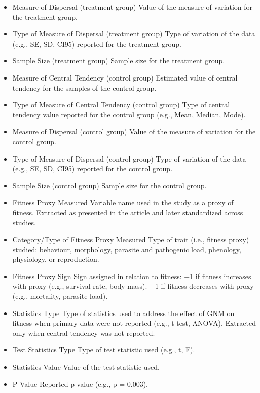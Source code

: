 \documentclass[
  number,
  review,
  onecolumn]{elsarticle}
\begin{document}
\begin{itemize}
  Type of Measure of Central Tendency (treatment group) Type of central
  tendency value reported for the treatment group (e.g., Mean, Median,
  Mode).
\item
  Measure of Dispersal (treatment group) Value of the measure of
  variation for the treatment group.
\item
  Type of Measure of Dispersal (treatment group) Type of variation of
  the data (e.g., SE, SD, CI95) reported for the treatment group.
\item
  Sample Size (treatment group) Sample size for the treatment group.
\item
  Measure of Central Tendency (control group) Estimated value of central
  tendency for the samples of the control group.
\item
  Type of Measure of Central Tendency (control group) Type of central
  tendency value reported for the control group (e.g., Mean, Median,
  Mode).
\item
  Measure of Dispersal (control group) Value of the measure of variation
  for the control group.
\item
  Type of Measure of Dispersal (control group) Type of variation of the
  data (e.g., SE, SD, CI95) reported for the control group.
\item
  Sample Size (control group) Sample size for the control group.
\item
  Fitness Proxy Measured Variable name used in the study as a proxy of
  fitness. Extracted as presented in the article and later standardized
  across studies.
\item
  Category/Type of Fitness Proxy Measured Type of trait (i.e., fitness
  proxy) studied: behaviour, morphology, parasite and pathogenic load,
  phenology, physiology, or reproduction.
\item
  Fitness Proxy Sign Sign assigned in relation to fitness: +1 if fitness
  increases with proxy (e.g., survival rate, body mass). −1 if fitness
  decreases with proxy (e.g., mortality, parasite load).
\item
  Statistics Type Type of statistics used to address the effect of GNM
  on fitness when primary data were not reported (e.g., t-test, ANOVA).
  Extracted only when central tendency was not reported.
\item
  Test Statistics Type Type of test statistic used (e.g., t, F).
\item
  Statistics Value Value of the test statistic used.
\item
  P Value Reported p-value (e.g., p = 0.003).

\end{itemize}
\end{document}
